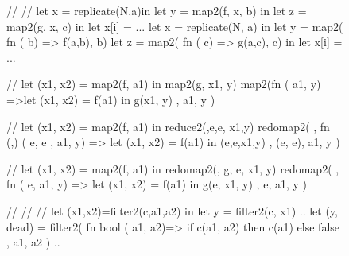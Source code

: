 \begin{figure}[bt]
\begin{colorcode}
// 
// 
let x = replicate(N,a)in 
let y = map2(f, x, b) in
let z = map2(g, x, c) in 
let x[i] = ...
    \emphh{\mymath{\equiv}}
let x = replicate(N, a) in 
let y = map2( fn  ( b) 
              => f(a,b), b)
let z = map2( fn  ( c) 
              => g(a,c), c)
in let x[i] = ...   


//  
let (x1, x2) = map2(f, a1)
in  map2(g, x1, y)   
    \emphh{\mymath{\equiv}}
map2(fn \mymath{\beta} ( a1,  y)
  =>let (x1, x2) = f(a1)
    in  g(x1, y)
, a1, y )


//
let (x1, x2) = map2(f, a1)
in  reduce2(\mymath{\oplus},e,e, x1,y)   
    \emphh{\mymath{\equiv}}
redomap2(\mymath{\oplus}
, fn (,) (  e,  e
             ,  a1, y)
   => let (x1, x2) = f(a1)
      in  \mymath{\oplus}(e,e,x1,y)
, (e, e), a1, y )


//
let (x1, x2) = map2(f, a1)
in  redomap2(\mymath{\oplus}, g, e, x1, y)
    \emphh{\mymath{\equiv}}
redomap2(\mymath{\oplus}
, fn \mymath{\beta} (\mymath{\beta} e,  a1,  y)
   => let (x1, x2) = f(a1)
      in  g(e, x1, y)
, e, a1, y )

//
//
//
let (x1,x2)=filter2(c,a1,a2)
in  let y = filter2(c, x1) ..
    \emphh{\mymath{\equiv}}
let (y, dead) = filter2(
  fn bool ( a1, a2)=> 
      if   c(a1, a2) 
      then c(a1) 
      else false 
, a1, a2 ) ..


\end{colorcode}
\end{figure}
